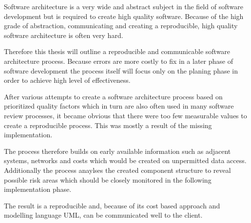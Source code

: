 Software architecture is a very wide and abstract subject in the field of software development but is required to create high quality software. Because of the high grade of abstraction, communicating and creating a reproducible, high quality software architecture is often very hard.

Therefore this thesis will outline a reproducible and communicable software architecture process. Because errors are more costly to fix in a later phase of software development the process itself will focus only on the planing phase in order to achieve high level of effectiveness.

After various attempts to create a software architecture process based on prioritized quality factors which in turn are also often used in many software review processes, it became obvious that there were too few measurable values to create a reproducible process. This was mostly a result of the missing implementation.

The process therefore builds on early available information such as adjacent systems, networks and costs which would be created on unpermitted data access. Additionally the process anaylses the created component structure to reveal possible risk areas which should be closely monitored in the following implementation phase.

The result is a reproducible and, because of its cost based approach and modelling language UML, can be communicated well to the client.